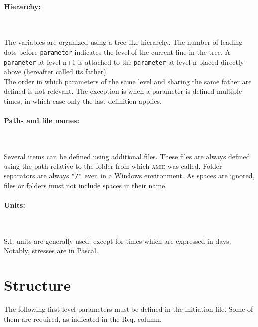 \documentclass[10pt]{article}
\newcommand{\amie}{\textsc{amie}\xspace}
\newcommand{\whiteline}{\textcolor{white}{.\\}}
\begin{document}
\paragraph{Hierarchy:} \whiteline

The variables are organized using a tree-like hierarchy.
The number of leading dots before \verb+parameter+ indicates the level of the current line in the tree.
A \verb+parameter+ at level n+1 is attached to the \verb+parameter+ at level n placed directly above (hereafter called its father).\\

The order in which parameters of the same level and sharing the same father are defined is not relevant.
The exception is when a parameter is defined multiple times, in which case only the last definition applies.\\

\paragraph{Paths and file names:} \whiteline

Several items can be defined using additional files.
These files are always defined using the path relative to the folder from which \amie was called.
Folder separators are always \verb+"/"+ even in a Windows environment.
As spaces are ignored, files or folders must not include spaces in their name.\\

\paragraph{Units:} \whiteline	

S.I. units are generally used, except for times which are expressed in days.
Notably, stresses are in Pascal.

\eject

\section{Structure}

The following first-level parameters must be defined in the initiation file.
Some of them are required, as indicated in the Req. column.\\
\end{document}
